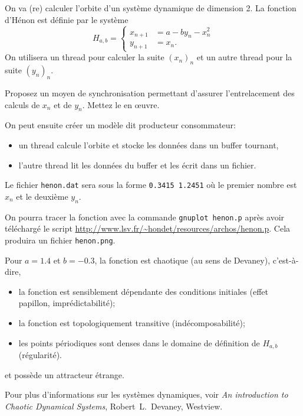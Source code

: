 \documentclass{exam}
\begin{document}
\begin{questions}
On va (re) calculer l'orbite d'un système dynamique de dimension 2. La fonction
d'Hénon est définie par le système
\begin{equation}
  \label{eq:1}
  H_{a,b} = \left\{
    \begin{aligned}
      x_{n + 1} &= a - by_{n} - x_{n}^{2} \\
      y_{n + 1} &= x_{n}.
    \end{aligned}
    \right.
\end{equation}
On utilisera un thread pour calculer la suite \( (x_n)_n \) et un
autre thread pour la suite \( (y_n)_n \).

Proposez un moyen de synchronisation permettant d'assurer
l'entrelacement des calculs de \( x_n \) et de \( y_n \). Mettez le en
\oe{}uvre.

On peut ensuite créer un modèle dit producteur consommateur:
\begin{itemize}
\item un thread calcule l'orbite et stocke les données dans un buffer
  tournant,
  \item l'autre thread lit les données du buffer et les écrit dans un fichier.
\end{itemize}
Le fichier \texttt{henon.dat} sera sous la forme
\texttt{0.3415 1.2451} où le premier nombre est $x_{n}$ et le deuxième $y_{n}$.

On pourra tracer la fonction avec la commande \texttt{gnuplot henon.p} après
avoir téléchargé le script
\url{http://www.lsv.fr/~hondet/resources/archos/henon.p}. Cela produira un
fichier \texttt{henon.png}.

Pour \( a = 1.4 \) et \( b = -0.3 \), la fonction est chaotique (au sens de
Devaney), c'est-à-dire,
\begin{itemize}
  \item la fonction est sensiblement dépendante des conditions initiales (effet
    papillon, imprédictabilité);
  \item la fonction est topologiquement transitive (indécomposabilité);
  \item les points périodiques sont denses dans le domaine de définition de
    $H_{a, b}$ (régularité).
\end{itemize}
et possède un attracteur étrange.

Pour plus d'informations sur les systèmes dynamiques, voir \textit{An
  introduction to Chaotic Dynamical Systems}, Robert~L.~Devaney, Westview.

\begin{solution}

\end{solution}
\end{questions}
\end{document}
